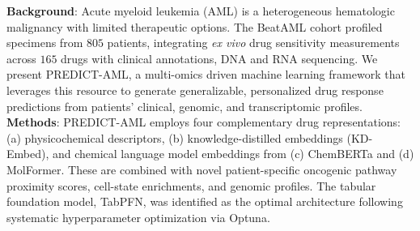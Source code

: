 \documentclass[pdflatex,sn-mathphys-num]{sn-jnl}
\theoremstyle{thmstyleone}
\theoremstyle{thmstyletwo}
\theoremstyle{thmstylethree}
\begin{document}
{%
\textbf{Background}: Acute myeloid leukemia (AML) is a heterogeneous hematologic malignancy with limited therapeutic options. The BeatAML cohort profiled specimens from $805$ patients, integrating \textit{ex vivo} drug sensitivity measurements across $165$ drugs with clinical annotations, DNA and RNA sequencing. We present PREDICT-AML, a multi-omics driven machine learning framework that leverages this resource to generate generalizable, personalized drug response predictions from patients' clinical, genomic, and transcriptomic profiles.\\
\textbf{Methods}: PREDICT-AML employs four complementary drug representations: (a) physicochemical descriptors, (b) knowledge-distilled embeddings (KD-Embed), and chemical language model embeddings from (c) ChemBERTa and (d) MolFormer. These are combined with novel patient-specific oncogenic pathway proximity scores, cell-state enrichments, and genomic profiles. The tabular foundation model, TabPFN, was identified as the optimal architecture following systematic hyperparameter optimization via Optuna.\\
}
\end{document}
